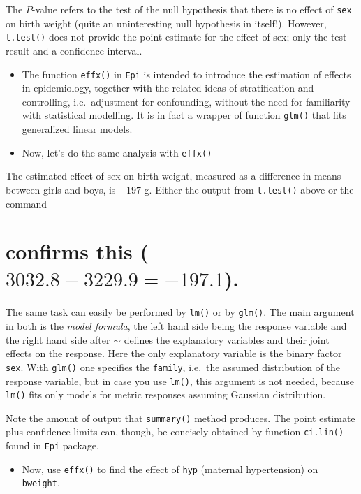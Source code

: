 \documentclass[
]{book}
\providecommand{\tightlist}{%
  \setlength{\itemsep}{0pt}\setlength{\parskip}{0pt}}
\begin{document}
The \(P\)-value refers to the test
of the null hypothesis that there is no effect of \texttt{sex} on birth weight
(quite an uninteresting null hypothesis in itself!). However, \texttt{t.test()} does not provide
the point estimate for the effect of sex; only the test result and a confidence interval.

\begin{itemize}
\item
  The function \texttt{effx()} in \texttt{Epi}
  is intended to introduce the estimation of effects in epidemiology, together with the related ideas of stratification and controlling, i.e.~adjustment for confounding,
  without the need for familiarity with statistical modelling.
  It is in fact a wrapper of function \texttt{glm()} that fits generalized linear models.
\item
  Now, let's do the same analysis with \texttt{effx()}
\end{itemize}

The estimated effect of sex on birth weight, measured as a difference
in means between girls and boys,
is \(-197\) g.
Either the output from \texttt{t.test()} above or the command

\section{\texorpdfstring{confirms this (\(3032.8-3229.9=-197.1\)).}{confirms this (3032.8-3229.9=-197.1).}}\label{confirms-this-3032.8-3229.9-197.1.}

The same task can easily be performed by \texttt{lm()} or by \texttt{glm()}. The main argument in both
is the \emph{model formula}, the left hand side being the response variable and the right hand side
after \(\sim\) defines the explanatory variables and their
joint effects on the response. Here the only
explanatory variable is the binary factor \texttt{sex}. With \texttt{glm()} one specifies the
\texttt{family}, i.e.~the assumed distribution of the response variable, but in case you use
\texttt{lm()}, this argument is not needed, because \texttt{lm()} fits only models for metric responses
assuming Gaussian distribution.

Note the amount of output that \texttt{summary()} method produces.
The point estimate plus confidence limits can, though, be concisely obtained by function
\texttt{ci.lin()} found in \texttt{Epi} package.

\begin{itemize}
\tightlist
\item
  Now, use \texttt{effx()} to find the effect of \texttt{hyp} (maternal hypertension)
  on \texttt{bweight}.
\end{itemize}
\end{document}
